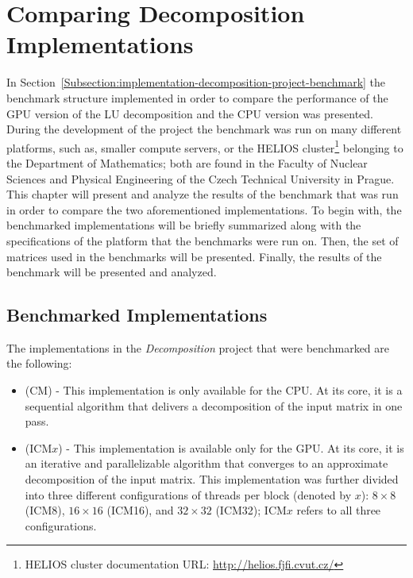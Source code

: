 \chapter{Comparing Decomposition Implementations \TO}\label{Chapter:benchmark-results}
In Section~\ref{Subsection:implementation-decomposition-project-benchmark} the benchmark structure implemented in order to compare the performance of the GPU version of the LU decomposition and the CPU version was presented. During the development of the project the benchmark was run on many different platforms, such as, smaller compute servers, or the HELIOS cluster\footnote{HELIOS cluster documentation URL: \url{http://helios.fjfi.cvut.cz/}} belonging to the Department of Mathematics; both are found in the Faculty of Nuclear Sciences and Physical Engineering of the Czech Technical University in Prague. This chapter will present and analyze the results of the benchmark that was run in order to compare the two aforementioned implementations. To begin with, the benchmarked implementations will be briefly summarized along with the specifications of the platform that the benchmarks were run on. Then, the set of matrices used in the benchmarks will be presented. Finally, the results of the benchmark will be presented and analyzed.

\section{Benchmarked Implementations \TO}\label{Section:benchmark-results-benchmarked-implementations}
The implementations in the \textit{Decomposition} project that were benchmarked are the following:

\begin{itemize}
	\item \textit{} (CM) - This implementation is only available for the CPU. At its core, it is a sequential algorithm that delivers a decomposition of the input matrix in one pass.
	\item \textit{} (ICM$ x $) - This implementation is available only for the GPU. At its core, it is an iterative and parallelizable algorithm that converges to an approximate decomposition of the input matrix. This implementation was further divided into three different configurations of threads per block (denoted by $ x $): $ 8\times 8 $ (ICM8), $ 16\times 16 $ (ICM16), and $ 32\times 32 $ (ICM32); ICM$ x $ refers to all three configurations.
\end{itemize}



